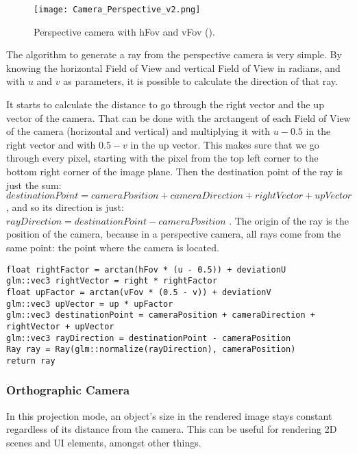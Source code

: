 \begin{figure}[H]
	\centering
	\caption{Perspective camera with hFov and vFov (\cite{Camera_Perspective_Orthographic}).}
	\label{Perspective_Camera.}
	\texttt{[image: Camera\_Perspective\_v2.png]}
\end{figure}

\par
The algorithm to generate a ray from the perspective camera is very simple.
By knowing the horizontal Field of View and vertical Field of View in radians, and with
$u$
and
$v$
as parameters, it is possible to calculate the direction of that ray.

\par
It starts to calculate the distance to go through the right vector and the up vector of the camera.
That can be done with the arctangent of each Field of View of the camera (horizontal and vertical) and multiplying it with
$u - 0.5$
in the right vector and with
$0.5 - v$
in the up vector.
This makes sure that we go through every pixel, starting with the pixel from the top left corner to the bottom right corner of the image plane.
Then the destination point of the ray is just the sum:\\
$destinationPoint = cameraPosition + cameraDirection + rightVector + upVector$
, and so its direction is just:\\
$rayDirection = destinationPoint - cameraPosition$
.
The origin of the ray is the position of the camera, because in a perspective camera, all rays come from the same point: the point where the camera is located.

\begin{lstlisting}[caption={Algorithm of generateRay in Perspective Camera}, captionpos=b, label=Perspective]
float rightFactor = arctan(hFov * (u - 0.5)) + deviationU
glm::vec3 rightVector = right * rightFactor
float upFactor = arctan(vFov * (0.5 - v)) + deviationV
glm::vec3 upVector = up * upFactor
glm::vec3 destinationPoint = cameraPosition + cameraDirection + rightVector + upVector
glm::vec3 rayDirection = destinationPoint - cameraPosition
Ray ray = Ray(glm::normalize(rayDirection), cameraPosition)
return ray
\end{lstlisting}


\subsubsection{Orthographic Camera}

\par
In this projection mode, an object's size in the rendered image stays constant regardless of its distance from the camera.
This can be useful for rendering 2D scenes and UI elements, amongst other things.


